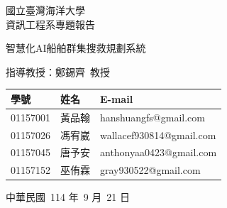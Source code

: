 \documentclass[12pt,a4paper]{article}
\begin{document}
\begin{titlepage}

	\centering
	\vspace*{2cm}
	
	{\Large 國立臺灣海洋大學\\[0.5cm]資訊工程系專題報告 \par}
	
	\vspace*{1cm}
	{\Huge 智慧化AI船舶群集搜救規劃系統 \par}
	
	\vfill
	
	{\Large 指導教授：鄭錫齊\ 教授 \par}
	\vspace*{1cm}
	\begin{tabular}{lll}
	學號 & 姓名 & E-mail \\
	\hline
	01157001 & 黃品翰 & hanshuangfs@gmail.com \\
	01157026 & 馮宥崴 & wallacef930814@gmail.com \\
	01157045 & 唐予安 & anthonyaa0423@gmail.com \\
	01157152 & 巫侑霖 & gray930522@gmail.com
	\end{tabular}

	\vspace*{1cm}
	{\Large 中華民國\ 114 年\ 9 月\ 21 日 \par}

\end{titlepage}

\vspace*{0.3\textheight}
\begin{abstract}
本研究提出一套「智慧化AI船舶群集搜救規劃系統」，旨在改善海上的搜救方式。傳統的搜救常常面臨海象險惡、作業風險高及搜尋範圍廣闊等挑戰，很容易錯過黃金救援時間，且存在高危險性。本研究希望透過無人船群集的系統化應用，透過現代 AI 技術進行更有效率的搜尋，以降低搜救人員傷亡風險，同時提升大範圍搜尋的效率，解決現有搜救作業的困難。
\par
為因應上述挑戰，本系統以無人船群集協作為核心，透過強化學習演算法規劃搜救路徑，並可根據海流、風向等環境因素即時調整搜尋方向。由於缺乏實體船舶作為驗證平台，本研究採用 Unity 模擬環境進行系統建構與實驗，並針對單人與多人落水情境進行測試，驗證其可行性。
\par
實驗結果顯示，本系統在單一落水搜救情境下達到 82\%  的搜尋成功率，相較於傳統人工搜尋僅約 50\%  的成功率有顯著提升；在多人落水的情況下，系統能搜尋到 78\%  的落水人員。此外，針對因風向影響的落水人員移動，本系統的預測準確率達 81\%。
\par
本研究的貢獻在於證實無人船群集應用於海上搜救的潛力，能有效降低人力風險並縮短救援時間。未來若能進一步導入真實海域測試，並結合感應器精度、通訊穩定性及實際惡劣天候下的作業考量，將更加貼近實際應用的需求，並提升系統的實用價值。

\end{abstract}
\end{document}

